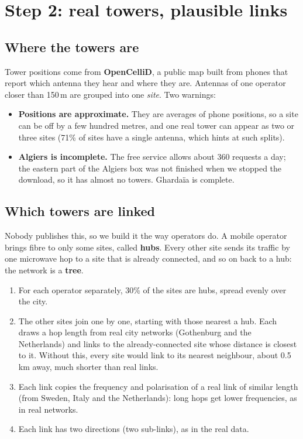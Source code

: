 \section{Step 2: real towers, plausible links}
\label{sec:p4_network}
\subsection{Where the towers are}
Tower positions come from \textbf{OpenCelliD}, a public map built from phones that report which antenna they hear and
where they are. Antennas of one operator closer than 150\,m are grouped into one \emph{site}. Two warnings:
\begin{itemize}
\item \textbf{Positions are approximate.} They are averages of phone positions, so a site can be off by a few hundred metres,
and one real tower can appear as two or three sites (71\% of sites have a single antenna, which hints at such splits).
\item \textbf{Algiers is incomplete.} The free service allows about 360 requests a day; the eastern part of the Algiers box
was not finished when we stopped the download, so it has almost no towers. Ghardaïa is complete.
\end{itemize}

\subsection{Which towers are linked}
Nobody publishes this, so we build it the way operators do. A mobile operator brings fibre to only some sites, called
\textbf{hubs}. Every other site sends its traffic by one microwave hop to a site that is already connected, and so on back
to a hub: the network is a \textbf{tree}.
\begin{enumerate}
\item For each operator separately, 30\% of the sites are hubs, spread evenly over the city.
\item The other sites join one by one, starting with those nearest a hub. Each draws a hop length from real city networks
(Gothenburg and the Netherlands) and links to the already-connected site whose distance is closest to it. Without this,
every site would link to its nearest neighbour, about 0.5\,km away, much shorter than real links.
\item Each link copies the frequency and polarisation of a real link of similar length (from Sweden, Italy and the
Netherlands): long hops get lower frequencies, as in real networks.
\item Each link has two directions (two sub-links), as in the real data.
\end{enumerate}

